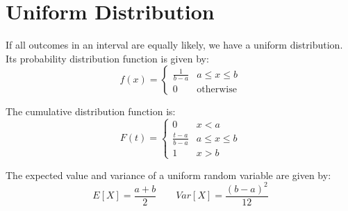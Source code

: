 \section{Uniform Distribution}

If all outcomes in an interval are equally likely, we have a uniform distribution.
Its probability distribution function is given by:
\[
f(x) = \begin{cases}
    \frac{1}{b-a} & a \leq x \leq b \\
    0 & \text{otherwise}
\end{cases}
\]

The cumulative distribution function is:
\[
F(t) = \begin{cases}
    0 & x < a \\
    \frac{t-a}{b-a} & a \leq x \leq b \\
    1 & x > b
\end{cases}
\]

The expected value and variance of a uniform random variable are given by:
\[
E[X] = \frac{a+b}{2} \qquad Var[X] = \frac{(b-a)^2}{12}
\]











